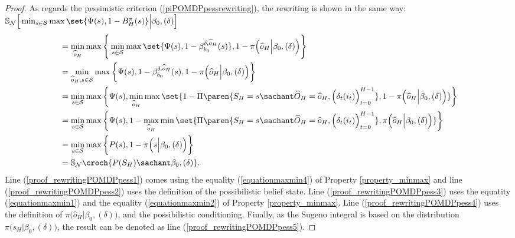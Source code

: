 \begin{proof}
As regards the pessimistic criterion (\ref{piPOMDPpessrewriting}),
the rewriting is shown in the same way:\\
$\mathbb{S}_{\mathcal{N}} \Big[ \min_{s \in \mathcal{S}} \max \set{\Psi(s), 1-B^{\pi}_H(s)} \Big\vert \beta_0, (\delta) \Big]$
\begin{align} 
\nonumber &= \min_{\widehat{o}_H} \max \Bigg\{ \min_{s \in \mathcal{S}} \max \set{\Psi(s), 1- \beta^{\delta,\widehat{o}_H}_{b_0}(s)}, 1- \pi \Big( \widehat{o}_H \Big\vert \beta_0, (\delta) \Big) \Bigg\}\\
\label{proof_rewritingPOMDPpess1} &= \min_{\widehat{o}_H,s\in\mathcal{S}} \max \bigg\{ \Psi(s), 1 - \beta^{\delta,\widehat{o}_H}_{b_0}(s), 1 - \pi \Big( \widehat{o}_H \Big\vert \beta_0, (\delta) \Big) \bigg\}\\
\label{proof_rewritingPOMDPpess2} &= \min_{s\in\mathcal{S}} \max \bigg\{ \Psi(s), \min_{\widehat{o}_H} \max \set{ 1 - \Pi \paren{ S_H =  s \sachant \widehat{O}_{H} = \widehat{o}_{H}, \Big(\delta_t(i_t)\Big)_{t=0}^{H-1} }, 1 - \pi \Big( \widehat{o}_H \Big\vert \beta_0, (\delta) \Big) } \bigg\}\\
\label{proof_rewritingPOMDPpess3} &= \min_{s\in\mathcal{S}} \max \bigg\{ \Psi(s), 1 - \max_{\widehat{o}_H} \min \set{ \Pi \paren{ S_H =  s \sachant \widehat{O}_{H} = \widehat{o}_{H}, \Big(\delta_t(i_t)\Big)_{t=0}^{H-1} }, \pi \Big( \widehat{o}_H \Big\vert \beta_0, (\delta) \Big) } \bigg\}\\
\label{proof_rewritingPOMDPpess4} &= \min_{s\in\mathcal{S}} \max \bigg\{ P(s), 1 - \pi \Big( s \Big\vert \beta_0, (\delta) \Big)  \bigg\}\\
\label{proof_rewritingPOMDPpess5} &= \mathbb{S}_{\mathcal{N}} \croch{ P(S_H) \sachant \beta_0, (\delta) }.
\end{align}
Line (\ref{proof_rewritingPOMDPpess1}) comes using the equality (\ref{equationmaxmin4}) 
of Property \ref{property_minmax} and
line (\ref{proof_rewritingPOMDPpess2}) uses the definition of the possibilistic belief state.
Line (\ref{proof_rewritingPOMDPpess3}) uses the equatity (\ref{equationmaxmin1}) and the equality (\ref{equationmaxmin2}) of Property \ref{property_minmax}.
Line (\ref{proof_rewritingPOMDPpess4}) uses the definition of $\pi \Big( \widehat{o}_H \Big\vert \beta_0, (\delta) \Big)$,
and the possibilistic conditioning. 
Finally, as the Sugeno integral 
is based on the distribution $\pi \Big( s_H \Big\vert \beta_0, (\delta) \Big)$,
the result can be denoted as 
line (\ref{proof_rewritingPOMDPpess5}).
\end{proof}

